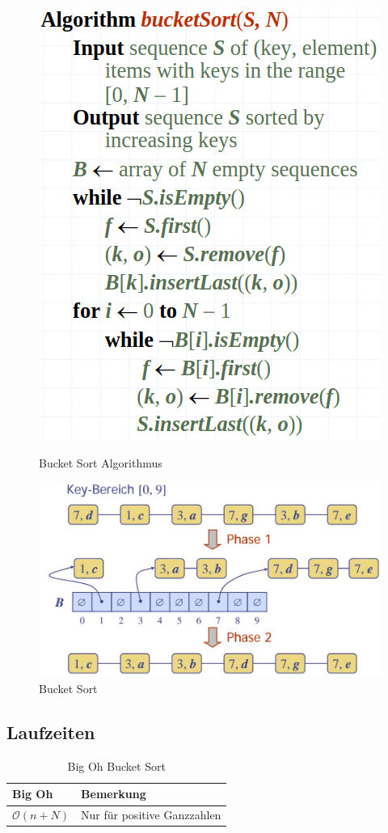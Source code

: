 \begin{figure}[h!]
	\centering
	\begin{minipage}[t]{0.4\textwidth}
		\centering
		\includegraphics[width=0.7\linewidth]{images/bucketsortalg}
		\caption{Bucket Sort Algorithmus}
		\label{fig:bucketsortalg}
	\end{minipage}
	\begin{minipage}[t]{0.5\textwidth}
		\centering
		\includegraphics[width=0.9\linewidth]{images/bucketsort}
		\caption{Bucket Sort}
		\label{fig:bucketsort}
	\end{minipage}
\end{figure}
\clearpage

\subsection{Laufzeiten}
\begin{table}[h]
	\centering
	\begin{tabu} to \linewidth {l l}
		\toprule
		Big Oh & Bemerkung \\
		\midrule
		$\mathcal{O}(n + N)$ & Nur für positive Ganzzahlen \\
		\bottomrule
	\end{tabu}
	\caption{Big Oh Bucket Sort}
\end{table}

